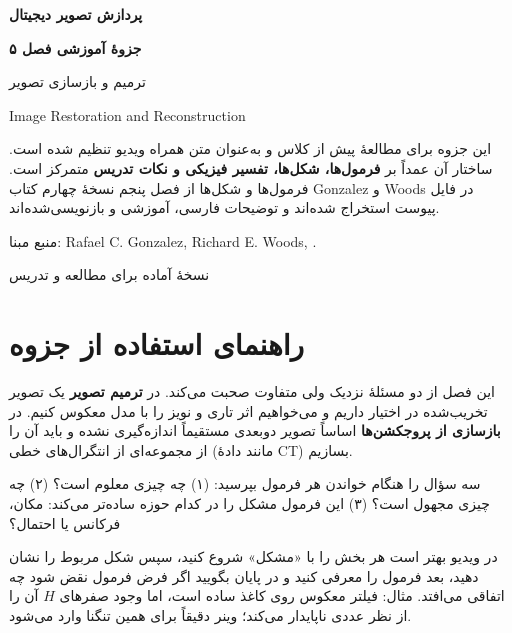 \documentclass[12pt,a4paper]{report}
\begin{document}
\begin{titlepage}
\centering
\vspace*{18mm}
{\Huge\bfseries پردازش تصویر دیجیتال\par}
\vspace{6mm}
{\LARGE\bfseries جزوهٔ آموزشی فصل ۵\par}
\vspace{4mm}
{\LARGE ترمیم و بازسازی تصویر\par}
\vspace{2mm}
{\large Image Restoration and Reconstruction\par}
\vspace{14mm}
\begin{tcolorbox}[width=.9\textwidth,colback=blue!3,colframe=blue!35!black]
این جزوه برای مطالعهٔ پیش از کلاس و به‌عنوان متن همراه ویدیو تنظیم شده است. ساختار آن عمداً بر \textbf{فرمول‌ها، شکل‌ها، تفسیر فیزیکی و نکات تدریس} متمرکز است. فرمول‌ها و شکل‌ها از فصل پنجم نسخهٔ چهارم کتاب Gonzalez و Woods در فایل پیوست استخراج شده‌اند و توضیحات فارسی، آموزشی و بازنویسی‌شده‌اند.
\end{tcolorbox}
\vfill
{\large منبع مبنا: Rafael C. Gonzalez, Richard E. Woods, .\par}
\vspace{8mm}
{\large نسخهٔ آماده برای مطالعه و تدریس\par}
\end{titlepage}
\tableofcontents
\clearpage
\chapter*{راهنمای استفاده از جزوه}
این فصل از دو مسئلهٔ نزدیک ولی متفاوت صحبت می‌کند. در \textbf{ترمیم تصویر} یک تصویر تخریب‌شده در اختیار داریم و می‌خواهیم اثر تاری و نویز را با مدل معکوس کنیم. در \textbf{بازسازی از پروجکشن‌ها} اساساً تصویر دوبعدی مستقیماً اندازه‌گیری نشده و باید آن را از مجموعه‌ای از انتگرال‌های خطی (مانند دادهٔ CT) بسازیم.

\begin{conceptbox}
سه سؤال را هنگام خواندن هر فرمول بپرسید: (۱) چه چیزی معلوم است؟ (۲) چه چیزی مجهول است؟ (۳) این فرمول مشکل را در کدام حوزه ساده‌تر می‌کند: مکان، فرکانس یا احتمال؟
\end{conceptbox}

\begin{teachbox}
در ویدیو بهتر است هر بخش را با «مشکل» شروع کنید، سپس شکل مربوط را نشان دهید، بعد فرمول را معرفی کنید و در پایان بگویید اگر فرض فرمول نقض شود چه اتفاقی می‌افتد. مثال: فیلتر معکوس روی کاغذ ساده است، اما وجود صفرهای \(H\) آن را از نظر عددی ناپایدار می‌کند؛ وینر دقیقاً برای همین تنگنا وارد می‌شود.
\end{teachbox}
\end{document}
